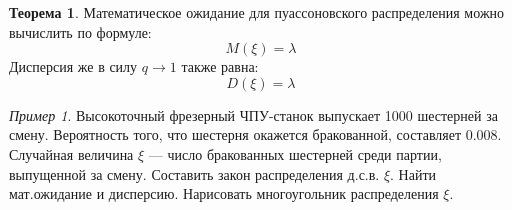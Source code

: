 \documentclass[12pt,a4paper]{article}
\theoremstyle{definition}
\theoremstyle{definition}
\newtheorem{theorem}{Теорема}[section]
\theoremstyle{remark}
\theoremstyle{corollary}
\theoremstyle{bolditalic}
\newtheorem{example}{Пример}[section]
\begin{document}
 \begin{theorem}
     Математическое ожидание для пуассоновского распределения можно вычислить по формуле:
     \[
     M(\xi)=\lambda
     \]
     Дисперсия же в силу $q \rightarrow1$ также равна:
      \[
      D(\xi)=\lambda
      \]
 \end{theorem}

 \begin{example}
     Высокоточный фрезерный ЧПУ-станок выпускает 1000 шестерней за
смену. Вероятность того, что шестерня окажется бракованной, составляет 0.008. Случайная величина $\xi$ --- число бракованных шестерней среди партии, выпущенной за смену. Составить закон распределения д.с.в. $\xi$. Найти мат.ожидание и дисперсию. Нарисовать многоугольник распределения $\xi$.
 \end{example}
\end{document}
